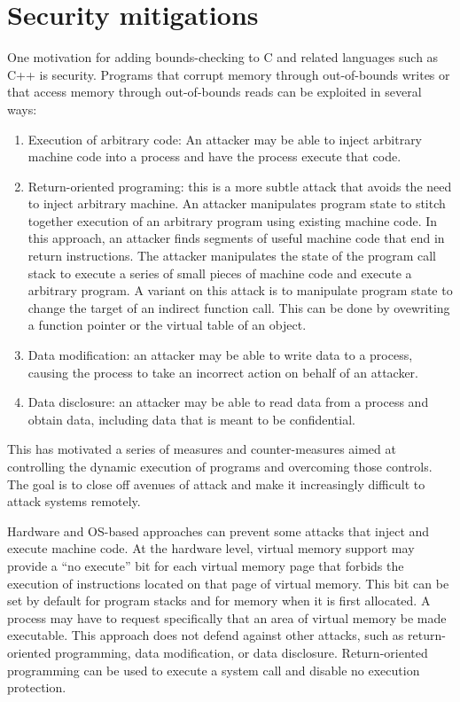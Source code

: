 \section{Security mitigations}
One motivation for adding bounds-checking to C and related languages
such as C++ is security.  Programs that
corrupt memory through out-of-bounds writes or that access memory through
out-of-bounds reads can be exploited in several ways:
\begin{enumerate}
\item  Execution of arbitrary code: An attacker may be able to inject arbitrary machine code into a process and have the process  execute that code.
\item Return-oriented programing: this is a more subtle attack that avoids the need to inject arbitrary machine.  An attacker manipulates program state to
stitch together  execution of an arbitrary program using existing machine code.
In this approach, an attacker finds segments of useful machine code that end in
return instructions. The attacker manipulates the state of the program call 
stack to execute a series of small pieces of machine code and execute a
arbitrary program.    A variant on this attack is to manipulate program state to
change the target of an indirect function call.  This can be done by 
ovewriting a function pointer or the virtual table of an object.
\item Data modification: an attacker may be able to write data to a process, causing the process to take an incorrect action on behalf of an attacker.
\item  Data disclosure: an attacker may be able to read data from a process 
and obtain data, including data that is meant to be confidential.  

\end{enumerate}
This has motivated a series of measures and counter-measures aimed at controlling the dynamic execution of programs and overcoming those controls. 
The goal is to close off avenues of attack and make it increasingly difficult 
to attack systems remotely.

Hardware and OS-based approaches can prevent some attacks that inject and
execute machine code.  At the hardware level, virtual memory support may provide
a ``no execute'' bit for each virtual memory page that forbids the execution
of instructions located on that page of virtual memory.  This bit can be set by
default for program stacks and for memory when it is first allocated. A process
may have to request specifically that an area of virtual memory be made
executable.  This approach does not defend against other attacks, such as
return-oriented programming, data modification, or data disclosure.  
Return-oriented programming can be used to execute a system call and disable
no execution protection.    

